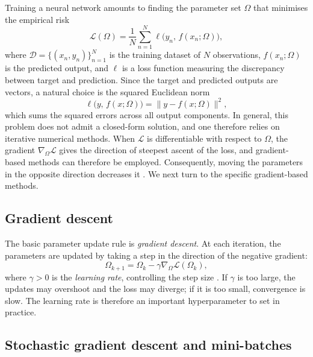 Training a neural network amounts to finding the parameter set $\Omega$ that minimises the empirical risk
\begin{equation}
    \mathcal{L}(\Omega) = \frac{1}{N}\sum_{n=1}^{N} \ell\bigl(y_n,\, f(x_n;\Omega)\bigr),
\label{eq:empirical_risk}
\end{equation}
where $\mathcal{D} = \{(x_n, y_n)\}_{n=1}^N$ is the training dataset of $N$ observations, $f(x_n;\Omega)$ is the predicted output, and $\ell$ is a loss function measuring the discrepancy between target and prediction. Since the target and predicted outputs are vectors, a natural choice is the squared Euclidean norm
\[
    \ell\bigl(y,\, f(x;\Omega)\bigr) = \|y - f(x;\Omega)\|^2,
\]
which sums the squared errors across all output components. In general, this problem does not admit a closed-form solution, and one therefore relies on iterative numerical methods. When $\mathcal{L}$ is differentiable with respect to $\Omega$, the gradient $\nabla_\Omega \mathcal{L}$ gives the direction of steepest ascent of the loss, and gradient-based methods can therefore be employed. Consequently, moving the parameters in the opposite direction decreases it \citep[Chs.~6,~8]{Goodfellow2016}. We next turn to the specific gradient-based methods.



\subsection{Gradient descent}

The basic parameter update rule is \emph{gradient descent}. At each iteration, the parameters are updated by taking a step in the direction of the negative gradient:
\begin{equation}
    \Omega_{k+1}
    =
    \Omega_k - \gamma \nabla_\Omega \mathcal{L}(\Omega_k),
\label{eq:gd}
\end{equation}
where $\gamma > 0$ is the \emph{learning rate}, controlling the step size \citep[Ch.~8]{Goodfellow2016}. If $\gamma$ is too large, the updates may overshoot and the loss may diverge; if it is too small, convergence is slow. The learning rate is therefore an important hyperparameter to set in practice.

\subsection{Stochastic gradient descent and mini-batches}

